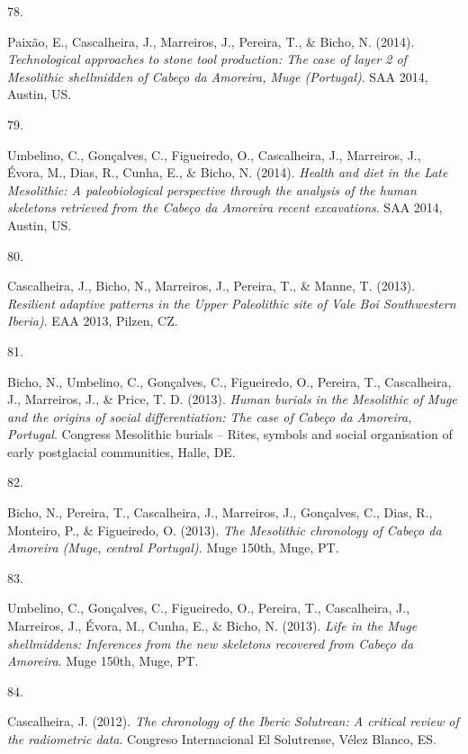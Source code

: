 \documentclass[11pt,a4paper,]{awesome-cv}
\newlength{\cslhangindent}
\newlength{\csllabelwidth}
\newenvironment{CSLReferences}[2] %
 {\begin{list}{}{%
  \setlength{\itemindent}{0pt}
  \setlength{\leftmargin}{0pt}
  \setlength{\parsep}{0pt}
  \ifodd #1
   \setlength{\leftmargin}{\cslhangindent}
   \setlength{\itemindent}{-1\cslhangindent}
  \fi
  \setlength{\itemsep}{#2\baselineskip}}}
 {\end{list}}
\newcommand{\CSLLeftMargin}[1]{\parbox[t]{\csllabelwidth}{\strut#1\strut}}
\newcommand{\CSLRightInline}[1]{\parbox[t]{\linewidth - \csllabelwidth}{\strut#1\strut}}
\begin{document}
\begin{CSLReferences}{0}{0}
\CSLLeftMargin{78. }%
\CSLRightInline{Paixão, E., Cascalheira, J., Marreiros, J., Pereira, T.,
\& Bicho, N. (2014). \emph{Technological approaches to stone tool
production: The case of layer 2 of Mesolithic shellmidden of Cabeço da
Amoreira, Muge (Portugal)}. SAA 2014, Austin, US.}

\CSLLeftMargin{79. }%
\CSLRightInline{Umbelino, C., Gonçalves, C., Figueiredo, O.,
Cascalheira, J., Marreiros, J., Évora, M., Dias, R., Cunha, E., \&
Bicho, N. (2014). \emph{Health and diet in the Late Mesolithic: A
paleobiological perspective through the analysis of the human skeletons
retrieved from the Cabeço da Amoreira recent excavations}. SAA 2014,
Austin, US.}

\CSLLeftMargin{80. }%
\CSLRightInline{Cascalheira, J., Bicho, N., Marreiros, J., Pereira, T.,
\& Manne, T. (2013). \emph{Resilient adaptive patterns in the Upper
Paleolithic site of Vale Boi Southwestern Iberia)}. EAA 2013, Pilzen,
CZ.}

\CSLLeftMargin{81. }%
\CSLRightInline{Bicho, N., Umbelino, C., Gonçalves, C., Figueiredo, O.,
Pereira, T., Cascalheira, J., Marreiros, J., \& Price, T. D. (2013).
\emph{Human burials in the Mesolithic of Muge and the origins of social
differentiation: The case of Cabeço da Amoreira, Portugal}. Congress
Mesolithic burials -- Rites, symbols and social organisation of early
postglacial communities, Halle, DE.}

\CSLLeftMargin{82. }%
\CSLRightInline{Bicho, N., Pereira, T., Cascalheira, J., Marreiros, J.,
Gonçalves, C., Dias, R., Monteiro, P., \& Figueiredo, O. (2013).
\emph{The Mesolithic chronology of Cabeço da Amoreira (Muge, central
Portugal)}. Muge 150th, Muge, PT.}

\CSLLeftMargin{83. }%
\CSLRightInline{Umbelino, C., Gonçalves, C., Figueiredo, O., Pereira,
T., Cascalheira, J., Marreiros, J., Évora, M., Cunha, E., \& Bicho, N.
(2013). \emph{Life in the Muge shellmiddens: Inferences from the new
skeletons recovered from Cabeço da Amoreira}. Muge 150th, Muge, PT.}

\CSLLeftMargin{84. }%
\CSLRightInline{Cascalheira, J. (2012). \emph{The chronology of the
Iberic Solutrean: A critical review of the radiometric data}. Congreso
Internacional El Solutrense, Vélez Blanco, ES.}


\end{CSLReferences}
\end{document}
